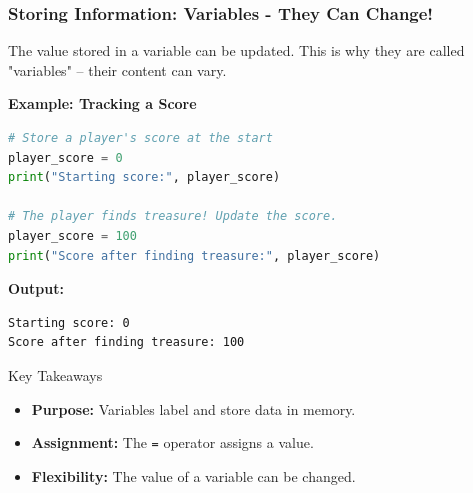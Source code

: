 \documentclass{beamer}
\begin{document}
\begin{frame}[fragile]
    \frametitle{Storing Information: Variables - They Can Change!}
    
    The value stored in a variable can be updated. This is why they are called "variables" -- their content can vary.
    
    \vspace{1em}
    
    \textbf{Example: Tracking a Score}
    \begin{lstlisting}[language=Python]
# Store a player's score at the start
player_score = 0
print("Starting score:", player_score)

# The player finds treasure! Update the score.
player_score = 100
print("Score after finding treasure:", player_score)
    \end{lstlisting}
    
    \textbf{Output:}
    \begin{lstlisting}
Starting score: 0
Score after finding treasure: 100
    \end{lstlisting}
    
    \begin{block}{Key Takeaways}
        \begin{itemize}
            \item \textbf{Purpose:} Variables label and store data in memory.
            \item \textbf{Assignment:} The \texttt{=} operator assigns a value.
            \item \textbf{Flexibility:} The value of a variable can be changed.
        \end{itemize}
    \end{block}
    
\end{frame}
\end{document}

